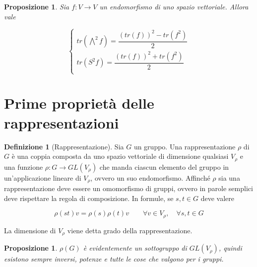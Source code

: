 \documentclass[11pt]{article}
\theoremstyle{plain}
\newtheorem{prop}[thm]{Proposizione}
\theoremstyle{definition}
\newtheorem{defn}{Definizione}[section]
\theoremstyle{remark}
\begin{document}
\begin{prop}
Sia $f: V \to V$ un endomorfismo di uno spazio vettoriale. Allora vale

\[ 
\begin{cases}
tr(\bigwedge^2 f ) = \dfrac{(tr(f))^2 - tr(f^2)}{2} \\
tr(S^2 f ) = \dfrac{(tr(f))^2 + tr(f^2)}{2} \\
\end{cases}
\]



\end{prop}
















\newpage
\section{Prime proprietà delle rappresentazioni}

\begin{defn}[Rappresentazione] Sia $G$ un gruppo. Una rappresentazione $\rho$ di $G$ è una coppia composta da uno spazio vettoriale di dimensione qualsiasi $V_\rho$ e una funzione $\rho: G \to GL(V_\rho)$ che manda ciascun elemento del gruppo in un'applicazione lineare di $V_\rho$, ovvero un suo endomorfismo. Affinché $\rho$ sia una rappresentazione deve essere un omomorfismo di gruppi, ovvero in parole semplici deve rispettare la regola di composizione. In formule, se $s, t \in G$ deve valere

\[ \rho(st) v = \rho(s)\rho(t) v \qquad \forall v \in V_\rho, \quad \forall s,t \in G\]

La dimensione di $V_\rho$ viene detta grado della rappresentazione.

\end{defn}

\begin{prop} $\rho(G)$ è evidentemente un sottogruppo di $GL(V_\rho)$, quindi esistono sempre inversi, potenze e tutte le cose che valgono per i gruppi.

\end{prop}
\end{document}
